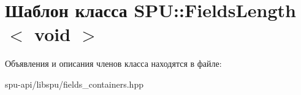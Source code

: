 \hypertarget{class_s_p_u_1_1_fields_length_3_01void_01_4}{}\section{Шаблон класса S\+PU\+:\+:Fields\+Length$<$ void $>$}
\label{class_s_p_u_1_1_fields_length_3_01void_01_4}


Объявления и описания членов класса находятся в файле\+:\begin{DoxyCompactItemize}
\item 
spu-\/api/libspu/fields\+\_\+containers.\+hpp\end{DoxyCompactItemize}
